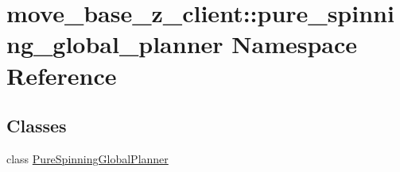 \hypertarget{namespacemove__base__z__client_1_1pure__spinning__global__planner}{}\section{move\+\_\+base\+\_\+z\+\_\+client\+:\+:pure\+\_\+spinning\+\_\+global\+\_\+planner Namespace Reference}
\label{namespacemove__base__z__client_1_1pure__spinning__global__planner}
\subsection*{Classes}
\begin{DoxyCompactItemize}
\item 
class \hyperlink{classmove__base__z__client_1_1pure__spinning__global__planner_1_1PureSpinningGlobalPlanner}{Pure\+Spinning\+Global\+Planner}
\end{DoxyCompactItemize}
